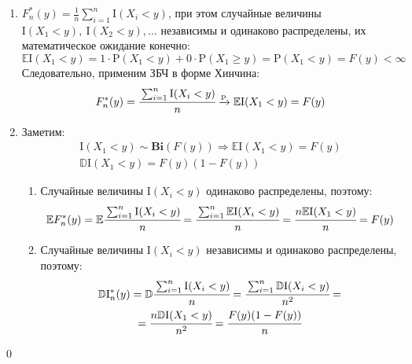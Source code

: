 \documentclass[oneside,final,14pt]{extreport}
\renewenvironment{proof}{{\bfseries Доказательство.}}{\qed}
\theoremstyle{definition}
\begin{document}
\begin{proof}\leavevmode
\begin{enumerate}
    \item $F_{n}^{*}(y)=\frac{1}{n} \sum_{i=1}^{n} \mathrm{I}(X_{i}<y)$, при этом случайные величины $\mathrm{I}(X_{1}<y),~ \mathrm{I}(X_{2}<y), \ldots$ независимы и одинаково распределены, их математическое ожидание конечно:
    \begin{equation*}
        \mathbb{E}\mathrm{I}(X_{1}<y)=1 \cdot \mathrm{P}(X_{1}<y)+0 \cdot \mathrm{P}(X_{1} \geqslant y)=\mathrm{P}(X_{1}<y)=F(y)<\infty
    \end{equation*}
    Следовательно, применим ЗБЧ в форме Хинчина:
    \begin{equation*}
        F_{n}^{*}(y)=\cfrac{\sum_{i=1}^{n} \mathrm{I}(X_{i}<y)}{n} \xrightarrow[]{\mathrm{p}} \mathbb{E}\mathrm{I}(X_{1}<y)=F(y) 
    \end{equation*}
    \item Заметим:
    \begin{gather*}
        \mathrm{I}(X_{1}<y) \sim  \mathbf{Bi}(F(y)) \Rightarrow \mathbb{E}\mathrm{I}(X_{1}<y) = F(y) \\
        \mathbb{D}\mathrm{I}(X_{1}<y) = F(y)(1-F(y))
    \end{gather*}
    \begin{enumerate}[label={\arabic*)}]
        \item Случайные величины $\mathrm{I}(X_{i}<y)$ одинаково распределены, поэтому:
        \begin{equation*}
            \mathbb{E} F_{n}^{*}(y)=\mathbb{E} \cfrac{\sum_{i=1}^{n} \mathrm{I}(X_{i}<y)}{n}=\cfrac{\sum_{i=1}^{n} \mathbb{E}\mathrm{I}(X_{i}<y)}{n}=\cfrac{n \mathbb{E}\mathrm{I}(X_{1}<y)}{n}=F(y)  
        \end{equation*}
        
        \item Случайные величины $\mathrm{I}(X_{i}<y)$ независимы и одинаково распределены, поэтому:
        \begin{multline*}
            \mathbb{D}\mathrm{I}_{n}^{*}(y)
            = \mathbb{D} \cfrac{\sum_{i=1}^{n} \mathrm{I}(X_{i}<y)}{n}
            = \cfrac{\sum_{i=1}^{n} \mathbb{D}\mathrm{I}(X_{i}<y)}{n^{2}}
            = \\
            = \cfrac{n\mathbb{D}\mathrm{I}(X_{1}<y)}{n^{2}}
            = \cfrac{F(y)(1-F(y))}{n}
        \end{multline*}
    

\end{enumerate}
\end{enumerate}
\end{proof}
\end{document}
